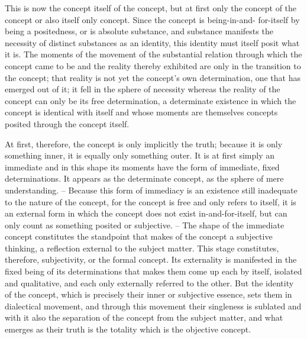 \documentclass{article}
\begin{document}
This is now the concept itself of the concept, but at first only the concept
of the concept or also itself only concept. Since the concept is being-in-and-
for-itself by being a positedness, or is absolute substance, and substance
manifests the necessity of distinct substances as an identity, this identity must
itself posit what it is. The moments of the movement of the substantial
relation through which the concept came to be and the reality thereby
exhibited are only in the transition to the concept; that reality is not yet the
concept’s own determination, one that has emerged out of it; it fell in the
sphere of necessity whereas the reality of the concept can only be its free
determination, a determinate existence in which the concept is identical
with itself and whose moments are themselves concepts posited through the
concept itself.

At first, therefore, the concept is only implicitly the truth; because it is
only something inner, it is equally only something outer. It is at first simply
an immediate and in this shape its moments have the form of immediate,
fixed determinations. It appears as the determinate concept, as the sphere of
mere understanding. – Because this form of immediacy is an existence still
inadequate to the nature of the concept, for the concept is free and only
refers to itself, it is an external form in which the concept does not exist
in-and-for-itself, but can only count as something posited or subjective. –
The shape of the immediate concept constitutes the standpoint that makes
of the concept a subjective thinking, a reflection external to the subject
matter. This stage constitutes, therefore, subjectivity, or the formal concept.
Its externality is manifested in the fixed being of its determinations that
makes them come up each by itself, isolated and qualitative, and each only
externally referred to the other. But the identity of the concept, which is
precisely their inner or subjective essence, sets them in dialectical movement,
and through this movement their singleness is sublated and with it also
the separation of the concept from the subject matter, and what emerges
as their truth is the totality which is the objective concept.
\end{document}
